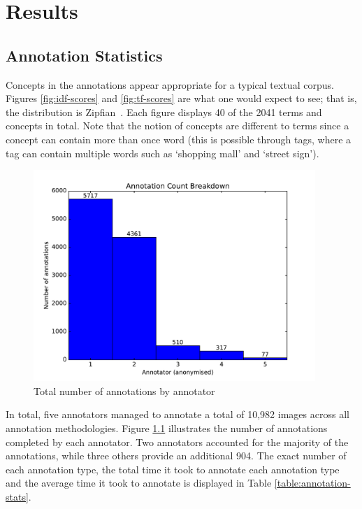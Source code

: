 \chapter{Results}

\section{Annotation Statistics}

Concepts in the annotations appear appropriate for a typical textual corpus. Figures \ref{fig:idf-scores} and \ref{fig:tf-scores} are what one would expect to see; that is, the distribution is Zipfian~\cite{tullo2003modelling}. Each figure displays 40 of the 2041 terms and concepts in total. Note that the notion of concepts are different to terms since a concept can contain more than once word (this is possible through tags, where a tag can contain multiple words such as `shopping mall' and `street sign').

\begin{figure}[!ht]
    \centering
    \includegraphics[width=0.95\textwidth]{graphs/annotator-breakdown}
    \caption{Total number of annotations by annotator}
    \label{fig:annotator-breakdown}
\end{figure}

In total, five annotators managed to annotate a total of 10,982 images across all annotation methodologies. Figure \ref{fig:annotator-breakdown} illustrates the number of annotations completed by each annotator. Two annotators accounted for the majority of the annotations, while three others provide an additional 904. The exact number of each annotation type, the total time it took to annotate each annotation type and the average time it took to annotate is displayed in Table \ref{table:annotation-stats}.

